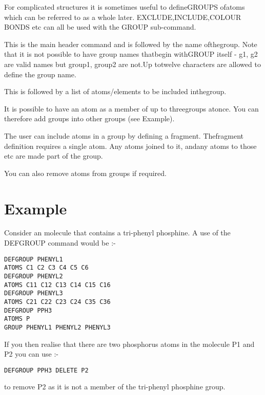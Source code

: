 \documentclass[10pt,a4paper]{report}
\begin{document}
For complicated structures it is sometimes useful to defineGROUPS ofatoms which can be referred to as a whole later. EXCLUDE,INCLUDE,COLOUR BONDS etc can all be used with the GROUP sub-command.

\bigskip{}



This is the main header command and is followed by the name ofthegroup. Note that it is not possible to have group names thatbegin withGROUP itself - g1, g2 are valid names but group1, group2 are not.Up totwelve characters are allowed to define the group name.

\bigskip{}

This is followed by a list of atoms/elements to be included inthegroup.

\bigskip{}

It is possible to have an atom as a member of up to threegroups atonce. You can therefore add groups into other groups (see Example).

\bigskip{}

The user can include atoms in a group by defining a fragment. Thefragment definition requires a single atom. Any atoms joined to it, andany atoms to those etc are made part of the group.

\bigskip{}

You can also remove atoms from groups if required.\section{Example}


Consider an molecule that contains a tri-phenyl phosphine. A
use of
the DEFGROUP command would be :-

\small\begin{verbatim}
DEFGROUP PHENYL1
ATOMS C1 C2 C3 C4 C5 C6
DEFGROUP PHENYL2
ATOMS C11 C12 C13 C14 C15 C16
DEFGROUP PHENYL3
ATOMS C21 C22 C23 C24 C35 C36
DEFGROUP PPH3
ATOMS P
GROUP PHENYL1 PHENYL2 PHENYL3
\end{verbatim}\normalsize


If you then realise that there are two phosphorus atoms in the
molecule
P1 and P2 you can use :-
\small\begin{verbatim}
DEFGROUP PPH3 DELETE P2
\end{verbatim}\normalsize


to remove P2 as it is not a member of the tri-phenyl phosphine
group.
\end{document}
